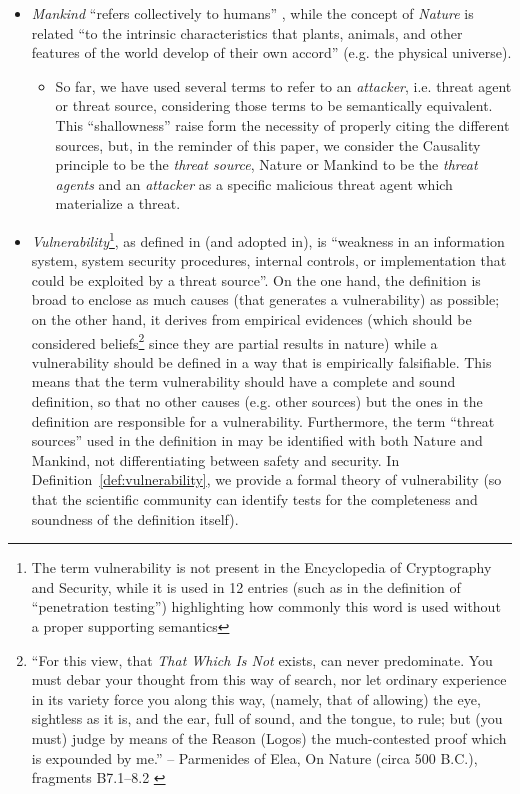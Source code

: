 \documentclass{article}
\theoremstyle{definition}
\theoremstyle{corollary}
\theoremstyle{lemma}
\theoremstyle{theorem}
\theoremstyle{theorem}
\begin{document}
\begin{itemize}
	\item \emph{Mankind} ``refers collectively to humans''
\autocite{wiki-mankind}, while the concept of \emph{Nature} is
		related ``to the intrinsic characteristics that plants,
		animals, and other features of the world develop of their own
		accord'' (e.g. the physical universe)\autocite{wiki-nature}. 
		\begin{itemize}
			\item So far, we have used several terms to refer to an
				\emph{attacker}, i.e. threat agent or threat source,
				considering those terms to be semantically
				equivalent.  This ``shallowness'' raise form the
				necessity of properly citing the different sources, but,
				in the reminder of this paper, we consider the
				Causality principle to be the \emph{threat
				source}, Nature or Mankind to be the
				\emph{threat agents} and an \emph{attacker} as
				a specific malicious threat agent which materialize a
				threat.
		\end{itemize}
	\item \emph{Vulnerability}\footnote{The term vulnerability is not
		present in the Encyclopedia of Cryptography and Security, while
		it is used in 12 entries (such as in the definition of
		``penetration testing''\autocite{caddy2005pentest})
		highlighting how commonly this word is used without a proper
		supporting semantics}, as defined in\autocite{cnssi20104009}
		(and adopted in\autocite{nist2013800-53}), is ``weakness in an
		information system, system security procedures, internal
		controls, or implementation that could be exploited by a threat
		source''. On the one hand, the definition is broad to enclose
		as much causes (that generates a vulnerability) as possible; on
		the other hand, it derives from empirical evidences (which
		should be considered beliefs\footnote{``For this view, that
		\emph{That Which Is Not} exists, can never predominate. You
		must debar your thought from this way of search, nor let
		ordinary experience in its variety force you along this way,
		(namely, that of allowing) the eye, sightless as it is, and the
		ear, full of sound, and the tongue, to rule; but (you must)
		judge by means of the Reason (Logos) the much-contested proof
		which is expounded by me.'' -- Parmenides of Elea, On Nature
		(circa 500 B.C.), fragments B7.1–8.2
		\autocite{Hakim2016philosophy}} since they are partial results in nature) 
		while a vulnerability should
		be defined in a way that is empirically falsifiable. This means
		that the term vulnerability should have a complete and sound
		definition, so that no other causes (e.g.  other sources) but
		the ones in the definition are responsible for a vulnerability.
		Furthermore, the term ``threat sources'' used in the definition
		in\autocite{cnssi20104009} may be identified with both Nature
		and Mankind, not differentiating between safety and security.
		In Definition~\ref{def:vulnerability}, we provide a formal
		theory of vulnerability (so that the scientific community can
		identify tests for the completeness and soundness of the
		definition itself).
\end{itemize}
\end{document}
